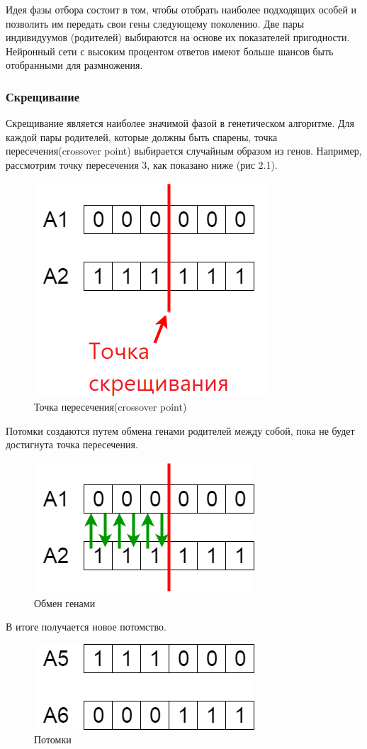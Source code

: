 Идея фазы отбора состоит в том, чтобы отобрать наиболее подходящих особей и позволить им передать свои гены следующему поколению. Две пары индивидуумов (родителей) выбираются на основе их показателей пригодности. Нейронный сети с высоким процентом ответов имеют больше шансов быть отобранными для размножения.

\subsubsection{Скрещивание}
\indent \indent Скрещивание является наиболее значимой фазой в генетическом алгоритме. Для каждой пары родителей, которые должны быть спарены, точка пересечения(crossover point) выбирается случайным образом из генов.
Например, рассмотрим точку пересечения 3, как показано ниже (рис 2.1). 

\begin{figure}[H]
  \centering
  \includegraphics[width=0.4\linewidth]{./img/crossover-point}
  \caption{Точка пересечения(crossover point)}
  \label{fig:mpr}
\end{figure} 

Потомки создаются путем обмена генами родителей между собой, пока не будет достигнута точка пересечения.

\begin{figure}[H]
  \centering
  \includegraphics[width=0.4\linewidth]{./img/genesis}
  \caption{Обмен генами}
  \label{fig:mpr}
\end{figure} 

В итоге получается новое потомство.

\begin{figure}[H]
  \centering
  \includegraphics[width=0.4\linewidth]{./img/child}
  \caption{Потомки}
  \label{fig:mpr}
\end{figure}

